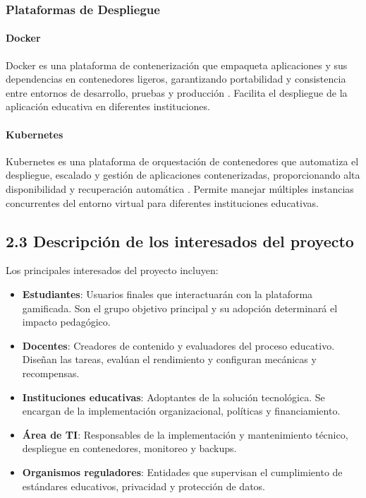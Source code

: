 \subsubsection{Plataformas de Despliegue}

\paragraph{Docker}
Docker es una plataforma de contenerización que empaqueta aplicaciones y sus dependencias en contenedores ligeros, garantizando portabilidad y consistencia entre entornos de desarrollo, pruebas y producción \cite{docker2023}. Facilita el despliegue de la aplicación educativa en diferentes instituciones.

\paragraph{Kubernetes}
Kubernetes es una plataforma de orquestación de contenedores que automatiza el despliegue, escalado y gestión de aplicaciones contenerizadas, proporcionando alta disponibilidad y recuperación automática \cite{kubernetes2023}. Permite manejar múltiples instancias concurrentes del entorno virtual para diferentes instituciones educativas.

\subsection{2.3 Descripción de los interesados del proyecto}

Los principales interesados del proyecto incluyen:

\begin{itemize}
	\item \textbf{Estudiantes}: Usuarios finales que interactuarán con la plataforma gamificada. Son el grupo objetivo principal y su adopción determinará el impacto pedagógico.
	\item \textbf{Docentes}: Creadores de contenido y evaluadores del proceso educativo. Diseñan las tareas, evalúan el rendimiento y configuran mecánicas y recompensas.
	\item \textbf{Instituciones educativas}: Adoptantes de la solución tecnológica. Se encargan de la implementación organizacional, políticas y financiamiento.
	\item \textbf{Área de TI}: Responsables de la implementación y mantenimiento técnico, despliegue en contenedores, monitoreo y backups.
	\item \textbf{Organismos reguladores}: Entidades que supervisan el cumplimiento de estándares educativos, privacidad y protección de datos.
\end{itemize}

